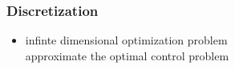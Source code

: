 
\begin{frame}
\frametitle{Discretization}
\begin{itemize}[<+->]
\item infinte dimensional optimization problem \\
\MVRightarrow {} approximate the optimal control problem 
\end{itemize}
\begin{figure}
\centering

\end{figure}





\end{frame}